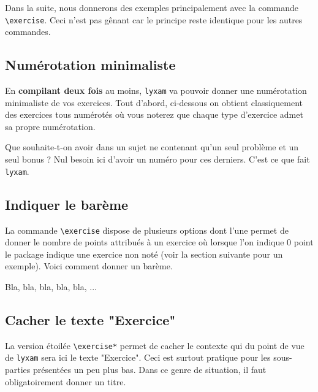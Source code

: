 \documentclass[12pt,a4paper]{scrartcl}
\makeatletter
\theoremstyle{definition}
\newcommand\resetallcnt{
    	\setcounter{lyxam@counter@topic}{0}
    	\setcounter{lyxam@counter@exercise}{0}
    	\setcounter{lyxam@counter@problem}{0}
    	\setcounter{lyxam@counter@bonus}{0}
    	\setcounter{lyxam@counter@subpart}{0}
    }
\makeatother
\begin{document}
Dans la suite, nous donnerons des exemples principalement avec la commande \verb+\exercise+. Ceci n'est pas gênant car le principe reste identique pour les autres commandes.


    \subsection{Numérotation minimaliste}

En \textbf{compilant deux fois} au moins, \verb+lyxam+ va pouvoir donner une numérotation minimaliste de vos exercices. Tout d'abord, ci-dessous on obtient classiquement des exercices tous numérotés où vous noterez que chaque type d'exercice admet sa propre numérotation.


\begin{tcblisting}{}
\exercise
\exercise
\problem
\problem
\end{tcblisting}


Que souhaite-t-on avoir dans un sujet ne contenant qu'un seul problème et un seul bonus ? Nul besoin ici d'avoir un numéro pour ces derniers. C'est ce que fait \verb+lyxam+.

\resetallcnt{}

\begin{tcblisting}{}
\exercise
\exercise
\problem
\bonus
\end{tcblisting}



    \subsection{Indiquer le barème}

La commande \verb+\exercise+ dispose de plusieurs options dont l'une permet de donner le nombre de points attribués à un exercice où lorsque l'on indique $0$ point le package indique une exercice non noté (voir la section suivante pour un exemple). Voici comment donner un barème.

\resetallcnt{}

\begin{tcblisting}{}
\exercise[pts = 5]
Bla, bla, bla, bla, bla, ...
\end{tcblisting}


    \subsection{Cacher le texte "Exercice"}

La version étoilée \verb+\exercise*+ permet de cacher le contexte qui du point de vue de \verb+lyxam+ sera ici le texte "Exercice". Ceci est surtout pratique pour les sous-parties présentées un peu plus bas. Dans ce genre de situation, il faut obligatoirement donner un titre.
\end{document}
